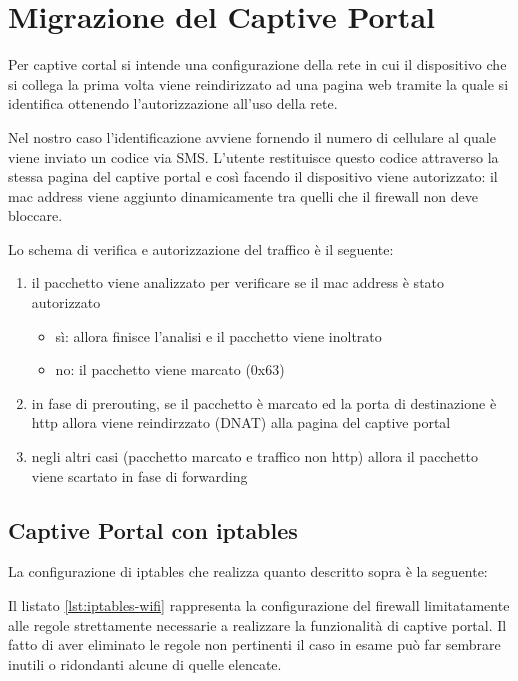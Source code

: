 \chapter{Migrazione del Captive Portal}


Per captive cortal si intende una configurazione della rete in cui il
dispositivo che si collega la prima volta viene reindirizzato ad una pagina web
tramite la quale si identifica ottenendo l'autorizzazione all'uso della rete.

Nel nostro caso l'identificazione avviene fornendo il numero di cellulare al
quale viene inviato un codice via SMS. L'utente restituisce questo codice
attraverso la stessa pagina del captive portal e cos\`i facendo il dispositivo
viene autorizzato: il mac address viene aggiunto dinamicamente tra quelli
che il firewall non deve bloccare.

Lo schema di verifica e autorizzazione del traffico è il seguente:
\begin{enumerate}
    \item il pacchetto viene analizzato per verificare se il mac
    address è stato autorizzato
    \begin{itemize}
        \item sì: allora finisce l'analisi e il pacchetto viene inoltrato
        \item no: il pacchetto viene marcato (0x63)
    \end{itemize}
    \item in fase di prerouting, se il pacchetto è marcato ed la porta di
    destinazione è http allora viene reindirzzato (DNAT) alla pagina del
    captive portal
    \item negli altri casi (pacchetto marcato e traffico non http) allora il
    pacchetto viene scartato in fase di forwarding
\end{enumerate}

\section{Captive Portal con iptables}
\label{lab:captive}
La configurazione di iptables che realizza quanto descritto sopra è la
seguente:

Il listato \ref{lst:iptables-wifi} rappresenta la configurazione del
firewall limitatamente alle regole strettamente necessarie a realizzare la
funzionalità di captive portal. Il fatto di aver eliminato le regole non
pertinenti il caso in esame può far sembrare inutili o ridondanti alcune di
quelle elencate.

